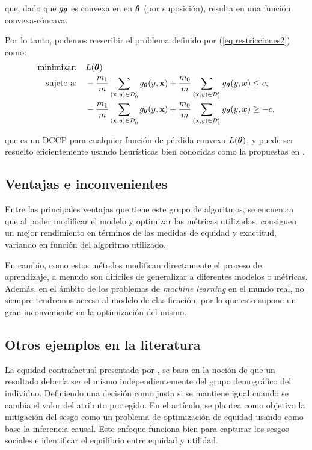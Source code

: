 \documentclass[oneside,openright,titlepage,numbers=noenddot,openany,headinclude,footinclude=true,
cleardoublepage=empty,abstractoff,BCOR=5mm,paper=a4,fontsize=12pt,main=spanish]{scrreprt}
\begin{document}
que, dado que $g_{\bm{\theta}}$ es convexa en en $\bm{\theta}$ (por suposición), resulta en una función convexa-cóncava. 

Por lo tanto, podemos reescribir el problema definido por (\ref{eq:restricciones2}) como:
\begin{equation*}
\begin{split}
\text{minimizar:} &\quad L(\bm{\theta})\\
\text{sujeto a:} &\quad
-\frac{m_1}{m} \sum_{(\textbf{x},y)\in \mathcal D_0'} g_{\bm{\theta}}(y,\textbf{x}) +\frac{m_0}{m} \sum_{(\textbf{x},y)\in \mathcal D_1'} g_{\bm{\theta}}(y,\bm{x}) \leq c,\\
&\quad -\frac{m_1}{m} \sum_{(\textbf{x},y)\in \mathcal D_0'} g_{\bm{\theta}}(y,\textbf{x})+\frac{m_0}{m} \sum_{(\textbf{x},y)\in \mathcal D_1'} g_{\bm{\theta}}(y,\bm{x}) \geq -c,
\end{split}
\end{equation*}

que es un DCCP para cualquier función de pérdida convexa $L(\bm{\theta})$, y puede ser resuelto eficientemente usando heurísticas bien conocidas como la propuestas en \cite{convex2016}. 

\subsection{Ventajas e inconvenientes}

Entre las principales ventajas que tiene este grupo de algoritmos, se encuentra que al poder modificar el modelo y optimizar las métricas utilizadas, consiguen un mejor rendimiento en términos de las medidas de equidad y exactitud, variando en función del algoritmo utilizado.

En cambio, como estos métodos modifican directamente el proceso de aprendizaje, a menudo son difíciles de generalizar a diferentes modelos o métricas. Además, en el ámbito de los problemas de \textit{machine learning} en el mundo real, no siempre tendremos acceso al modelo de clasificación, por lo que esto supone un gran inconveniente en la optimización del mismo.

\clearpage

\subsection*{Otros ejemplos en la literatura}

La equidad contrafactual presentada por \cite{counterfactual2018}, se basa en la noción de que un resultado debería ser el mismo independientemente del grupo demográfico del individuo. Definiendo una decisión como justa si se mantiene igual cuando se cambia el valor del atributo protegido. En el artículo, se plantea como objetivo la mitigación del sesgo como un problema de optimización de equidad usando como base la inferencia causal. Este enfoque funciona bien para capturar los sesgos sociales e identificar el equilibrio entre equidad y utilidad. 
\end{document}
